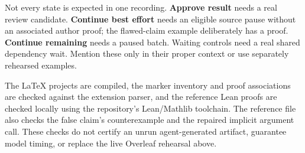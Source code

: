 Not every state is expected in one recording. \textbf{Approve result} needs a
real review candidate. \textbf{Continue best effort} needs an eligible source
pause without an associated author proof; the flawed-claim example deliberately
has a proof. \textbf{Continue remaining} needs a paused batch. Waiting controls
need a real shared dependency wait. Mention these only in their proper context
or use separately rehearsed examples.

The LaTeX projects are compiled, the marker inventory and proof associations
are checked against the extension parser, and the reference Lean proofs are
checked locally using the repository's Lean/Mathlib toolchain. The reference
file also checks the false claim's counterexample and the repaired implicit
argument call. These checks do not certify an unrun agent-generated artifact,
guarantee model timing, or replace the live Overleaf rehearsal above.
